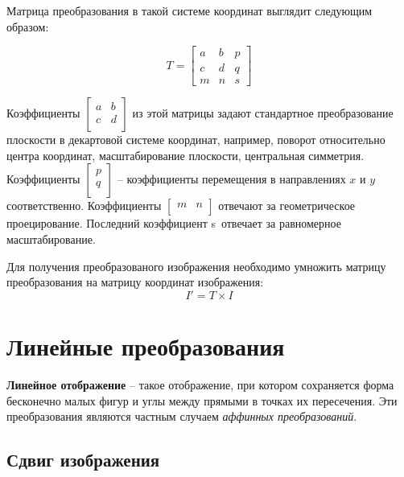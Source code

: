 Матрица преобразования в такой системе координат выглядит следующим образом:

\begin{equation}
    T = \begin{bmatrix}
        a & b & p \\
        c & d & q \\
        m & n & s
    \end{bmatrix}
\end{equation}

{
\renewcommand*{\arraystretch}{0.4}
Коэффициенты $\left[\begin{matrix}a&b\\c&d\\\end{matrix}\right]$ из этой матрицы задают стандартное преобразование плоскости в декартовой системе координат, например, поворот относительно центра координат, масштабирование плоскости, центральная симметрия. 
Коэффициенты $\left[\begin{matrix}p\\q\\\end{matrix}\right]$ – коэффициенты перемещения в направлениях $x$ и $y$ соответственно. 
Коэффициенты  $\left[\begin{matrix}m&n\\\end{matrix}\right]$ отвечают за геометрическое проецирование. 
Последний коэффициент s\ отвечает за равномерное масштабирование. 
}

Для получения преобразованого изображения необходимо умножить матрицу преобразования на матрицу координат изображения:
\begin{equation}
    I' = T \times I
\end{equation}


\section{Линейные преобразования}

\textbf{Линейное отображение} -- такое отображение, при котором сохраняется форма бесконечно малых фигур и углы между прямыми в точках их пересечения. 
Эти преобразования являются частным случаем \textit{аффинных преобразований}.

\subsection{Сдвиг изображения}

